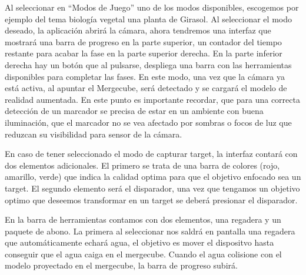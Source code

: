 Al seleccionar en ``Modos de Juego'' uno de los modos disponibles, escogemos por ejemplo del tema biología vegetal una planta de Girasol. Al seleccionar el modo deseado, la aplicación abrirá la cámara, ahora tendremos una interfaz que mostrará una barra de progreso en la parte superior, un contador del tiempo restante para acabar la fase en la parte superior derecha. En la parte inferior derecha hay un botón que al pulsarse, despliega una barra con las herramientas disponibles para completar las fases.
En este modo, una vez que la cámara ya está activa, al apuntar el Mergecube, será detectado y se cargará el modelo de realidad aumentada. En este punto es importante recordar, que para una correcta detección de un marcador se precisa de estar en un ambiente con buena iluminación, que el marcador no se vea afectado por sombras o focos de luz que reduzcan su visibilidad para sensor de la cámara.

En caso de tener seleccionado el modo de capturar target, la interfaz contará con dos elementos adicionales. El primero se trata de una barra de colores (rojo, amarillo, verde) que indica la calidad optima para que el objetivo enfocado sea un target. El segundo elemento será el disparador, una vez que tengamos un objetivo optimo que deseemos transformar en un target se deberá presionar el disparador.

En la barra de herramientas contamos con dos elementos, una regadera y un paquete de abono. La primera al seleccionar nos saldrá en pantalla una regadera que automáticamente echará agua, el objetivo es mover el dispositvo hasta conseguir que el agua caiga en el mergecube. Cuando el agua colisione con el modelo proyectado en el mergecube, la barra de progreso subirá. 

